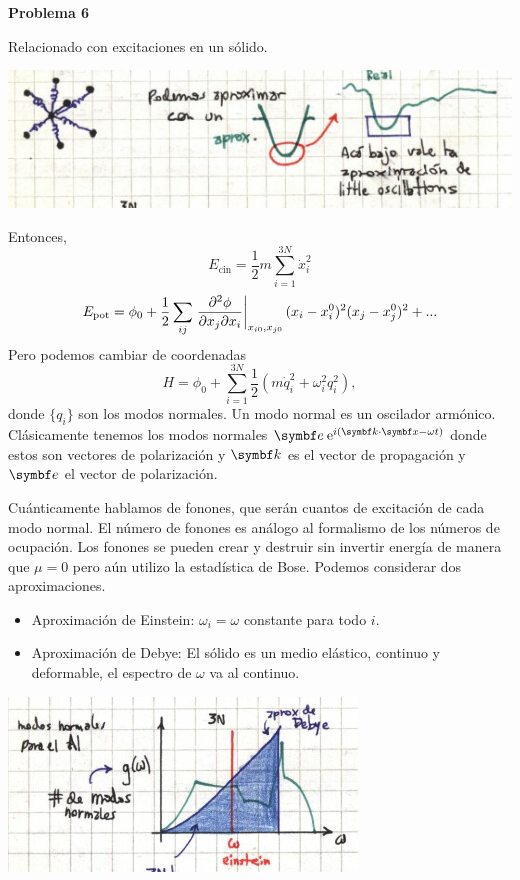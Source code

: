 \documentclass[10pt,oneside]{CBFT_book}
\begin{document}
\begin{ejemplo}{\bf Problema 6}

Relacionado con excitaciones en un sólido.

\includegraphics[scale=0.4]{images/1606329667.jpg}

Entonces,
\[
	E_{\text{cin}} = \frac{1}{2} m \sum_{i=1}^{3N} \dot{x}^2_i
\]
\[
	E_{\text{pot}} = \phi_0 + 
	\frac{1}{2} \sum_{ij} \left. \dparcru{ \phi}{x_i}{x_j}\right|_{x_{i0},x_{j0}}
	(x_i-x_i^0)^2(x_j-x_j^0)^2 + ... 
\]
Pero podemos cambiar de coordenadas
\[
	H = \phi_0 + \sum_{i=1}^{3N} \frac{1}{2} ( m \dot{q}^2_i + \omega^2_i q_i^2 ),
\]
donde $\{ q_i \}$ son los modos normales. Un modo normal es un oscilador armónico.
Clásicamente tenemos los modos normales $\vb{e} \euler^{ i ( \vb{k}\cdot \vbx - \omega t)} $ donde estos 
son vectores de polarización y $\vb{k}$  es el vector de propagación y  $\vb{e}$ el vector de polarización.

Cuánticamente hablamos de fonones, que serán cuantos de excitación de cada modo normal.
El número de fonones es análogo al formalismo de los números de ocupación.
Los fonones se pueden crear y destruir sin invertir energía de manera que $\mu=0$ pero aún utilizo la
estadística de Bose.
Podemos considerar dos aproximaciones.
\begin{itemize}
 \item Aproximación de Einstein: $\omega_i = \omega$ constante para todo $i$.
 \item Aproximación de Debye: El sólido es un medio elástico, continuo y deformable, el espectro de
 $\omega$ va al continuo.
\end{itemize}

\includegraphics[scale=0.4]{images/1606337002.jpg}


\end{ejemplo}
\end{document}
